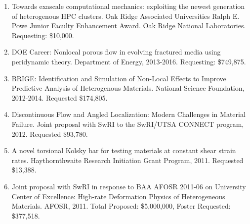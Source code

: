 \begin{enumerate}
    \item Towards exascale computational mechanics: exploiting the newest generation of heterogenous HPC clusters. Oak Ridge Associated Universities Ralph E. Powe Junior Faculty Enhancement Award. Oak Ridge National Laboratories. Requesting: \$10,000. 
    \item DOE Career: Nonlocal porous flow in evolving fractured media using peridynamic theory. Department of Energy, 2013-2016. Requesting: \$749,875. 
    \item BRIGE: Identification and Simulation of Non-Local Effects to Improve Predictive Analysis of Heterogenous Materials. National Science Foundation, 2012-2014. Requested \$174,805.
    \item Discontinuous Flow and Angled Localization: Modern Challenges in Material Failure. Joint proposal with SwRI to the SwRI/UTSA CONNECT program, 2012. Requested \$93,780.
    \item A novel torsional Kolsky bar for testing materials at constant shear strain rates. Haythornthwaite Research Initiation Grant Program, 2011. Requested \$13,388.
    \item Joint proposal with SwRI in response to BAA AFOSR 2011-06 on University Center of Excellence: High-rate Deformation Physics of Heterogeneous Materials. AFOSR, 2011. Total Proposed: \$5,000,000, Foster Requested: \$377,518.
\end{enumerate}
